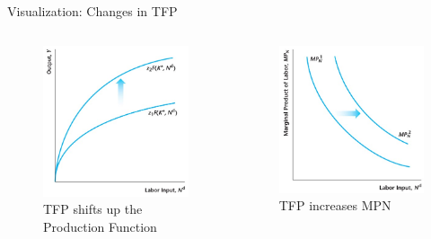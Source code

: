 \documentclass[11pt,aspectratio=169,usenames,dvipsnames]{beamer}
\begin{document}
\begin{frame}{Visualization: Changes in TFP}
\label{slide:Visualization__Changes_in_TFP}
\begin{columns}
    \begin{column}{0.5\textwidth}
        \begin{figure}
            \caption{TFP shifts up the Production Function}
            \includegraphics[width=.8\textwidth]{./figures/Figure4_16.jpg}
        \end{figure}
    \end{column}
    \begin{column}{0.5\textwidth}
        \begin{figure}
            \caption{TFP increases MPN}
            \includegraphics[width=.8\textwidth]{./figures/Figure4_17.jpg}
        \end{figure}
    \end{column}
\end{columns}

\end{frame}
\end{document}
